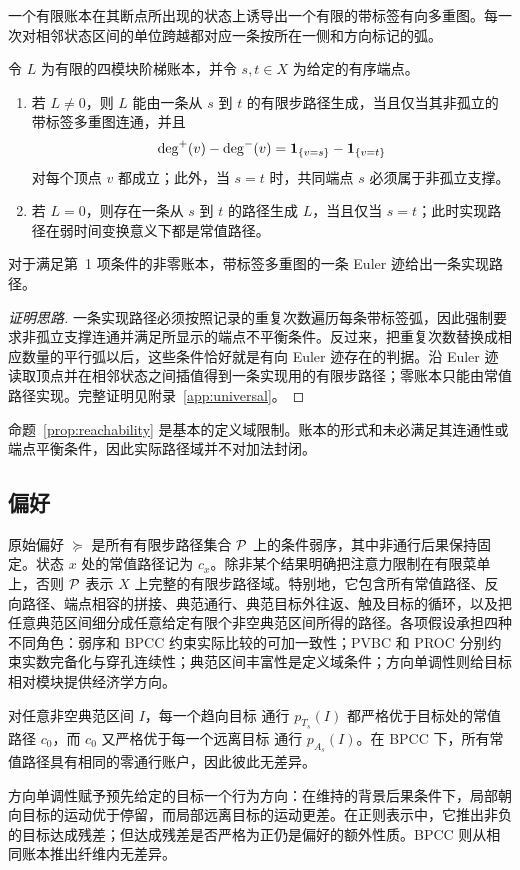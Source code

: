 一个有限账本在其断点所出现的状态上诱导出一个有限的带标签有向多重图。每一次对相邻状态区间的单位跨越都对应一条按所在一侧和方向标记的弧。

\begin{proposition}[记录通行账户的可行性]\label{prop:reachability}
令 $L$ 为有限的四模块阶梯账本，并令 $s,t\in X$ 为给定的有序端点。
\begin{enumerate}
 \item 若 $L\ne0$，则 $L$ 能由一条从 $s$ 到 $t$ 的有限步路径生成，当且仅当其非孤立的带标签多重图连通，并且
 \[
  \deg^+(v)-\deg^-(v)
  =\mathbf 1_{\{v=s\}}-\mathbf 1_{\{v=t\}}
 \]
 对每个顶点 $v$ 都成立；此外，当 $s=t$ 时，共同端点 $s$ 必须属于非孤立支撑。
 \item 若 $L=0$，则存在一条从 $s$ 到 $t$ 的路径生成 $L$，当且仅当 $s=t$；此时实现路径在弱时间变换意义下都是常值路径。
\end{enumerate}
对于满足第~1 项条件的非零账本，带标签多重图的一条 Euler 迹给出一条实现路径。
\end{proposition}

\begin{proof}[证明思路]
一条实现路径必须按照记录的重复次数遍历每条带标签弧，因此强制要求非孤立支撑连通并满足所显示的端点不平衡条件。反过来，把重复次数替换成相应数量的平行弧以后，这些条件恰好就是有向 Euler 迹存在的判据。沿 Euler 迹读取顶点并在相邻状态之间插值得到一条实现用的有限步路径；零账本只能由常值路径实现。完整证明见附录~\ref{app:universal}。
\end{proof}

命题~\ref{prop:reachability} 是基本的定义域限制。账本的形式和未必满足其连通性或端点平衡条件，因此实际路径域并不对加法封闭。

\subsection{偏好}

原始偏好 $\succeq$ 是所有有限步路径集合 $\mathcal P$ 上的条件弱序，其中非通行后果保持固定。状态 $x$ 处的常值路径记为 $c_x$。除非某个结果明确把注意力限制在有限菜单上，否则 $\mathcal P$ 表示 $X$ 上完整的有限步路径域。特别地，它包含所有常值路径、反向路径、端点相容的拼接、典范通行、典范目标外往返、触及目标的循环，以及把任意典范区间细分成任意给定有限个非空典范区间所得的路径。各项假设承担四种不同角色：弱序和 BPCC 约束实际比较的可加一致性；PVBC 和 PROC 分别约束实数完备化与穿孔连续性；典范区间丰富性是定义域条件；方向单调性则给目标相对模块提供经济学方向。

\begin{assumption}[面向目标的方向单调性]\label{ass:directional}
对任意非空典范区间 $I$，每一个趋向目标 通行 $p_{T_s}(I)$ 都严格优于目标处的常值路径 $c_0$，而 $c_0$ 又严格优于每一个远离目标 通行 $p_{A_s}(I)$。在 BPCC 下，所有常值路径具有相同的零通行账户，因此彼此无差异。
\end{assumption}

方向单调性赋予预先给定的目标一个行为方向：在维持的背景后果条件下，局部朝向目标的运动优于停留，而局部远离目标的运动更差。在正则表示中，它推出非负的目标达成残差；但达成残差是否严格为正仍是偏好的额外性质。BPCC 则从相同账本推出纤维内无差异。
